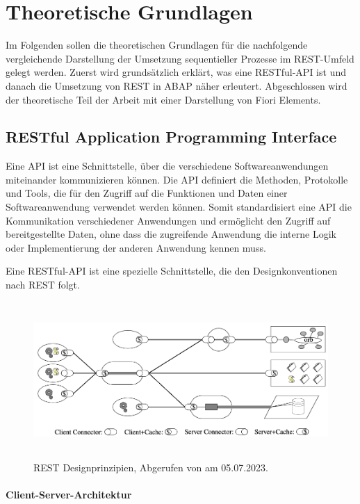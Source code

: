 \chapter{Theoretische Grundlagen}

Im Folgenden sollen die theoretischen Grundlagen für die nachfolgende vergleichende Darstellung der Umsetzung sequentieller Prozesse im REST-Umfeld gelegt werden. Zuerst wird grundsätzlich erklärt, was eine RESTful-API ist und danach die Umsetzung von REST in ABAP näher erleutert. Abgeschlossen wird der theoretische Teil der Arbeit mit einer Darstellung von Fiori Elements.

\section{RESTful Application Programming Interface}

Eine API ist eine Schnittstelle, über die verschiedene Softwareanwendungen miteinander kommunizieren können. Die API definiert die Methoden, Protokolle und Tools, die für den Zugriff auf die Funktionen und Daten einer Softwareanwendung verwendet werden können. Somit standardisiert eine API die Kommunikation verschiedener Anwendungen und ermöglicht den Zugriff auf bereitgestellte Daten, ohne dass die zugreifende Anwendung die interne Logik oder Implementierung der anderen Anwendung kennen muss.

Eine RESTful-API ist eine spezielle Schnittstelle, die den Designkonventionen nach REST folgt.

\begin{figure}[H]
    \centering
    \includegraphics[height=5.95cm]{Bilder/REST_Rest.png}
    \caption[REST Designprinzipien]{REST Designprinzipien, Abgerufen von \cite{fielding_architectural_2000} am 05.07.2023.}
    \label{fig:iso_norm}
\end{figure}

\subsubsection{Client-Server-Architektur}

